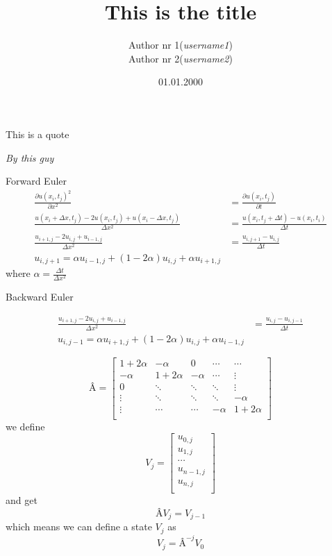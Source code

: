 \documentclass[10pt,a4paper]{article}
\begin{document}
\title{This is the title}
\author{
	\begin{tabular}{rl}
		Author nr 1 & (\textit{username1})\\
		Author nr 2 & (\textit{username2})\\
	\end{tabular}}
\date{01.01.2000}
\maketitle



\setlength{\epigraphwidth}{0.75\textwidth}
\renewcommand{\epigraphflush}{center}
\renewcommand{\beforeepigraphskip}{50pt}
\renewcommand{\afterepigraphskip}{100pt}
\renewcommand{\epigraphsize}{\normalsize}
\epigraph{This is a quote}
	{\textit{By this guy}}
\pagebreak


Forward Euler
\begin{align}
\frac{\partial u(x_i,t_j)^2}{\partial x^2} &= \frac{\partial u(x_i,t_j)}{\partial t} \\
\frac{u(x_i + \Delta x, t_j) - 2u(x_i,t_j) + u(x_i - \Delta x, t_j)}{\Delta x^2}
&= \frac{u(x_i, t_j + \Delta t) - u(x_i, t_i)}{\Delta t} \\
\frac{u_{i+1,j} - 2u_{i,j}+u_{i-1,j}}{\Delta x^2} &= \frac{u_{i,j+1} - u_{i,j}}{\Delta t} \\
u_{i,j+1} = \alpha u_{i-1,j} + (1-2\alpha)u_{i,j} + \alpha u_{i+1,j}
\end{align}
where $\alpha = \frac{\Delta t}{\Delta x^2}$

Backward Euler

\begin{align}
\frac{u_{i+1,j} - 2u_{i,j}+u_{i-1,j}}{\Delta x^2} &= \frac{u_{i,j} - u_{i,j-1}}{\Delta t} \\
u_{i,j-1} = \alpha u_{i+1,j} + (1 - 2\alpha )u_{i,j} + \alpha u_{i-1,j}
\end{align}


\[
Â = \begin{bmatrix}
1+2\alpha & -\alpha & 0 & \cdots & \cdots \\
-\alpha & 1+2\alpha & -\alpha & \cdots & \vdots \\
0 & \ddots & \ddots & \ddots & \vdots \\
\vdots & \ddots & \ddots & \ddots & -\alpha \\
\vdots & \cdots & \cdots & -\alpha & 1+2\alpha \\
\end{bmatrix}
\]
we define
\[ V_j = \begin{bmatrix}
u_{0,j}\\
u_{1,j}\\
\cdots\\
u_{n-1,j}\\
u_{n,j}\\
\end{bmatrix}
\]
and get
\begin{equation}
ÂV_j = V_{j-1}
\end{equation}
which means we can define a state $V_j$ as
\begin{equation}
V_j = Â^{-j}V_0
\end{equation}
\end{document}
